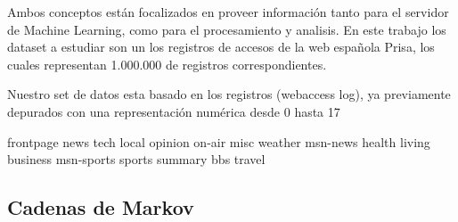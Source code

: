 	Ambos conceptos están focalizados en  proveer información tanto para el servidor de Machine Learning, como para el procesamiento y analisis.
	En este trabajo los dataset a estudiar son un los registros de accesos de la web española Prisa, los cuales representan 1.000.000 de registros correspondientes.

	Nuestro set de  datos esta basado en los registros (webaccess log), ya previamente depurados con una representación numérica desde 0 hasta 17 

	frontpage news tech local opinion on-air misc weather msn-news health living business msn-sports sports summary bbs travel









\subsection{Cadenas de Markov}






